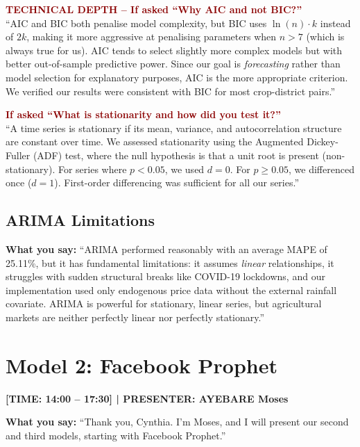 \documentclass[11pt,a4paper]{article}
\begin{document}
\begin{mdframed}[backgroundcolor=red!5, linecolor=darkred]
\textcolor{darkred}{\textbf{TECHNICAL DEPTH -- If asked ``Why AIC and not BIC?''}}\\
``AIC and BIC both penalise model complexity, but BIC uses $\ln(n) \cdot k$ instead of $2k$, making it more aggressive at penalising parameters when $n > 7$ (which is always true for us). AIC tends to select slightly more complex models but with better out-of-sample predictive power. Since our goal is \textit{forecasting} rather than model selection for explanatory purposes, AIC is the more appropriate criterion. We verified our results were consistent with BIC for most crop-district pairs.''

\textcolor{darkred}{\textbf{If asked ``What is stationarity and how did you test it?''}}\\
``A time series is stationary if its mean, variance, and autocorrelation structure are constant over time. We assessed stationarity using the Augmented Dickey-Fuller (ADF) test, where the null hypothesis is that a unit root is present (non-stationary). For series where $p < 0.05$, we used $d=0$. For $p \geq 0.05$, we differenced once ($d=1$). First-order differencing was sufficient for all our series.''
\end{mdframed}

\subsection{ARIMA Limitations}
\textbf{What you say:}
``ARIMA performed reasonably with an average MAPE of 25.11\%, but it has fundamental limitations: it assumes \textit{linear} relationships, it struggles with sudden structural breaks like COVID-19 lockdowns, and our implementation used only endogenous price data without the external rainfall covariate. ARIMA is powerful for stationary, linear series, but agricultural markets are neither perfectly linear nor perfectly stationary.''

\newpage
\section{Model 2: Facebook Prophet}
\textcolor{timecolor}{\textbf{[TIME: 14:00 -- 17:30] | PRESENTER: AYEBARE Moses}}

\textbf{What you say:}
``Thank you, Cynthia. I'm Moses, and I will present our second and third models, starting with Facebook Prophet.''
\end{document}
